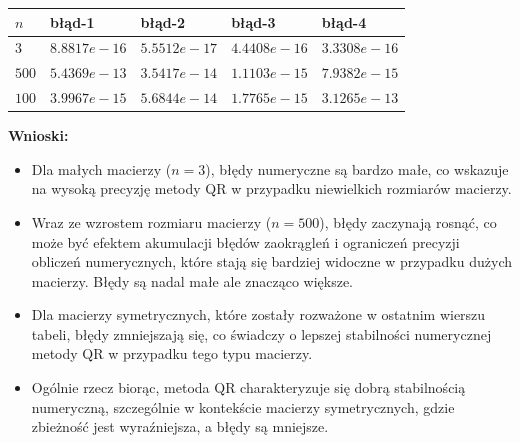 \begin{center}
\begin{tabular}{|l|l|l|l|l|}
\hline 
$n$   & błąd-1       & błąd-2       & błąd-3       & błąd-4       \\ \hline
$3$   & $8.8817e-16$ & $5.5512e-17$ & $4.4408e-16$ & $3.3308e-16$ \\ \hline
$500$ & $5.4369e-13$ & $3.5417e-14$ & $1.1103e-15$ & $7.9382e-15$ \\ \hline
$100$ & $3.9967e-15$ & $5.6844e-14$ & $1.7765e-15$ & $3.1265e-13$ \\ \hline
\end{tabular}
\end{center}

\textbf{Wnioski:}
\begin{itemize}
    \item Dla małych macierzy (\( n = 3 \)), błędy numeryczne są bardzo małe, co wskazuje na wysoką precyzję metody QR w przypadku niewielkich rozmiarów macierzy.
    \item Wraz ze wzrostem rozmiaru macierzy (\( n = 500 \)), błędy zaczynają rosnąć, co może być efektem akumulacji błędów zaokrągleń i ograniczeń precyzji obliczeń numerycznych, które stają się bardziej widoczne w przypadku dużych macierzy. Błędy są nadal małe ale znacząco większe. 
    \item Dla macierzy symetrycznych, które zostały rozważone w ostatnim wierszu tabeli, błędy zmniejszają się, co świadczy o lepszej stabilności numerycznej metody QR w przypadku tego typu macierzy.
    \item Ogólnie rzecz biorąc, metoda QR charakteryzuje się dobrą stabilnością numeryczną, szczególnie w kontekście macierzy symetrycznych, gdzie zbieżność jest wyraźniejsza, a błędy są mniejsze.
\end{itemize}
